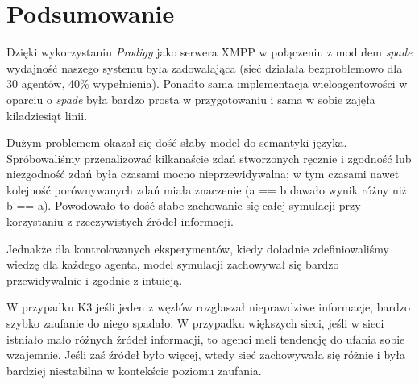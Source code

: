 \documentclass{article}
\begin{document}
	\section{Podsumowanie}
	Dzięki wykorzystaniu \textit{Prodigy} jako serwera XMPP w połączeniu z modułem \textit{spade} wydajność naszego systemu była zadowalająca (sieć działała bezproblemowo dla 30 agentów, 40\% wypełnienia). Ponadto sama implementacja wieloagentowości w oparciu o \textit{spade} była bardzo prosta w przygotowaniu i sama w sobie zajęła kiladziesiąt linii.

	Dużym problemem okazał się dość słaby model do semantyki języka. Spróbowaliśmy przenalizować kilkanaście zdań stworzonych ręcznie i zgodność lub niezgodność zdań była czasami mocno nieprzewidywalna; w tym czasami nawet kolejność porównywanych zdań miała znaczenie (a == b dawało wynik różny niż b == a). Powodowało to dość słabe zachowanie się całej symulacji przy korzystaniu z rzeczywistych źródeł informacji.

	Jednakże dla kontrolowanych eksperymentów, kiedy doładnie zdefiniowaliśmy wiedzę dla każdego agenta, model symulacji zachowywał się bardzo przewidywalnie i zgodnie z intuicją. 
	
	W przypadku K3 jeśli jeden z węzłów rozgłaszał nieprawdziwe informacje, bardzo szybko zaufanie do niego spadało. W przypadku większych sieci, jeśli w sieci istniało mało różnych źródeł informacji, to agenci meli tendencję do ufania sobie wzajemnie. Jeśli zaś źródeł było więcej, wtedy sieć zachowywała się różnie i była bardziej niestabilna w kontekście poziomu zaufania.
\end{document}
